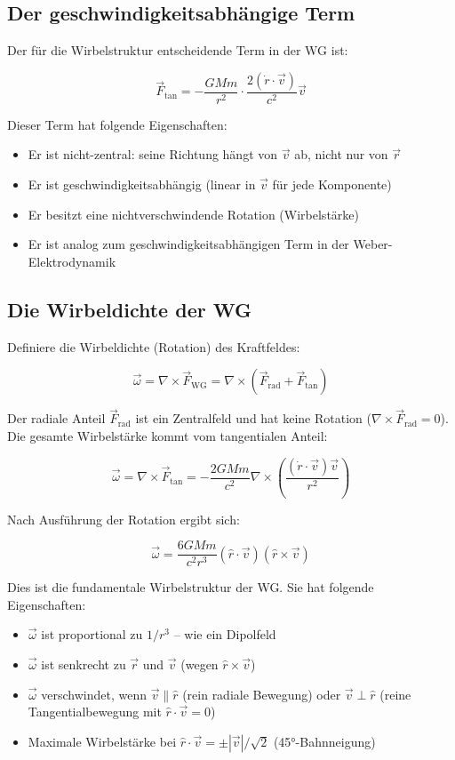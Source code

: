 \subsection{Der geschwindigkeitsabhängige Term}
\label{sub:tan_term_wg}

Der für die Wirbelstruktur entscheidende Term in der WG ist:

\[
\vec{F}_{\text{tan}} = -\frac{GMm}{r^2} \cdot \frac{2(\dot{r} \cdot \vec{v})}{c^2} \vec{v}
\]

Dieser Term hat folgende Eigenschaften:

\begin{itemize}
    \item Er ist nicht-zentral: seine Richtung hängt von \( \vec{v} \) ab, nicht nur von \( \vec{r} \)
    \item Er ist geschwindigkeitsabhängig (linear in \( \vec{v} \) für jede Komponente)
    \item Er besitzt eine nichtverschwindende Rotation (Wirbelstärke)
    \item Er ist analog zum geschwindigkeitsabhängigen Term in der Weber-Elektrodynamik
\end{itemize}

\subsection{Die Wirbeldichte der WG}
\label{sub:wirbeldichte_wg}

Definiere die Wirbeldichte (Rotation) des Kraftfeldes:

\[
\vec{\omega} = \nabla \times \vec{F}_{\text{WG}} = \nabla \times (\vec{F}_{\text{rad}} + \vec{F}_{\text{tan}})
\]

Der radiale Anteil \( \vec{F}_{\text{rad}} \) ist ein Zentralfeld und hat keine Rotation (\( \nabla \times \vec{F}_{\text{rad}} = 0 \)). Die gesamte Wirbelstärke kommt vom tangentialen Anteil:

\[
\vec{\omega} = \nabla \times \vec{F}_{\text{tan}} = -\frac{2GMm}{c^2} \nabla \times \left( \frac{(\dot{r} \cdot \vec{v}) \vec{v}}{r^2} \right)
\]

Nach Ausführung der Rotation ergibt sich:

\[
\boxed{\vec{\omega} = \frac{6GMm}{c^2 r^3} (\hat{r} \cdot \vec{v})(\hat{r} \times \vec{v})}
\]

Dies ist die fundamentale Wirbelstruktur der WG. Sie hat folgende Eigenschaften:

\begin{itemize}
    \item \( \vec{\omega} \) ist proportional zu \( 1/r^3 \) – wie ein Dipolfeld
    \item \( \vec{\omega} \) ist senkrecht zu \( \vec{r} \) und \( \vec{v} \) (wegen \( \hat{r} \times \vec{v} \))
    \item \( \vec{\omega} \) verschwindet, wenn \( \vec{v} \parallel \hat{r} \) (rein radiale Bewegung) oder \( \vec{v} \perp \hat{r} \) (reine Tangentialbewegung mit \( \hat{r} \cdot \vec{v} = 0 \))
    \item Maximale Wirbelstärke bei \( \hat{r} \cdot \vec{v} = \pm |\vec{v}|/\sqrt{2} \) (45°-Bahnneigung)
\end{itemize}

